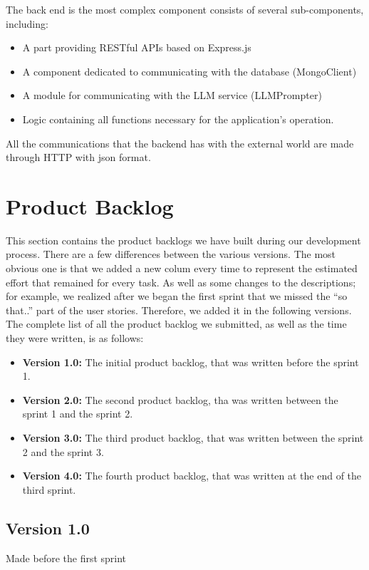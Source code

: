 \documentclass{article}
\begin{document}
The back end is the most complex component consists of several sub-components, including:
\begin{itemize}
  \item A part providing RESTful APIs based on Express.js
  \item A component dedicated to communicating with the database (MongoClient)
  \item A module for communicating with the LLM service (LLMPrompter)
  \item Logic containing all functions necessary for the application's operation.
\end{itemize}
All the communications that the backend has with the external world are made through HTTP with json format.
\newpage
\section{Product Backlog}

This section contains the product backlogs we have built during our development process.
There are a few differences between the various versions. The most obvious one is that we added a new colum
every time to represent the estimated effort that remained for every task. As well as some changes to the descriptions;
for example, we realized after we began the first sprint that we missed the ``so that..'' part of the user stories.
Therefore, we added it in the following versions.\newline
The complete list of all the product backlog we submitted, as well as the time they were written, is as follows:

\begin{itemize}
  \item \textbf{Version 1.0:} The initial product backlog, that was written before the sprint 1.
  \item \textbf{Version 2.0:} The second product backlog, tha was written between the sprint 1 and the sprint 2.
  \item \textbf{Version 3.0:} The third product backlog, that was written between the sprint 2 and the sprint 3.
  \item \textbf{Version 4.0:} The fourth product backlog, that was written at the end of the third sprint.
\end{itemize}
\newpage

\begin{center}
\vspace*{3in}
\subsection{Version 1.0}
Made before the first sprint
\end{center}

\end{document}
